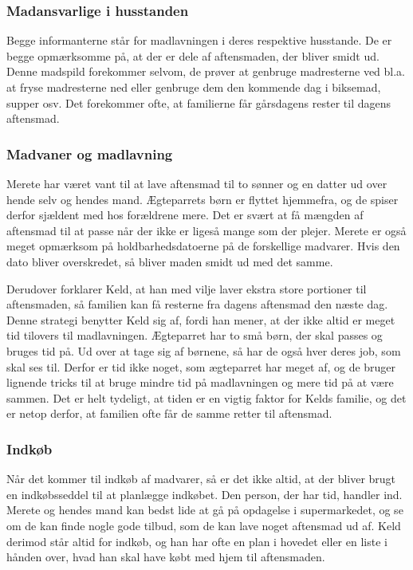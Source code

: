 \subsubsection*{Madansvarlige i husstanden}
Begge informanterne står for madlavningen i deres respektive husstande. De er begge opmærksomme på, at der er dele af aftensmaden, der bliver smidt ud. Denne madspild forekommer selvom, de prøver at genbruge madresterne ved bl.a. at fryse madresterne ned eller genbruge dem den kommende dag i \fx biksemad, supper osv. Det forekommer ofte, at familierne får gårsdagens rester til dagens aftensmad.

\subsubsection*{Madvaner og madlavning}
Merete har været vant til at lave aftensmad til to sønner og en datter ud over hende selv og hendes mand. Ægteparrets børn er flyttet hjemmefra, og de spiser derfor sjældent med hos forældrene mere. Det er svært at få mængden af aftensmad til at passe når der ikke er ligeså mange som der plejer. Merete er også meget opmærksom på holdbarhedsdatoerne på de forskellige madvarer. Hvis den dato bliver overskredet, så bliver maden smidt ud med det samme.

Derudover forklarer Keld, at han med vilje laver ekstra store portioner til aftensmaden, så familien kan få resterne fra dagens aftensmad den næste dag. Denne strategi benytter Keld sig af, fordi han mener, at der ikke altid er meget tid tilovers til madlavningen. Ægteparret har to små børn, der skal passes og bruges tid på. Ud over at tage sig af børnene, så har de også hver deres job, som skal ses til. Derfor er tid ikke noget, som ægteparret har meget af, og de bruger lignende tricks til at bruge mindre tid på madlavningen og mere tid på at være sammen. Det er helt tydeligt, at tiden er en vigtig faktor for Kelds familie, og det er netop derfor, at familien ofte får de samme retter til aftensmad.

\subsubsection*{Indkøb}
Når det kommer til indkøb af madvarer, så er det ikke altid, at der bliver brugt en indkøbsseddel til at planlægge indkøbet. Den person, der har tid, handler ind. Merete og hendes mand kan bedst lide at gå på opdagelse i supermarkedet, og se om de kan finde nogle gode tilbud, som de kan lave noget aftensmad ud af. Keld derimod står altid for indkøb, og han har ofte en plan i hovedet eller en liste i hånden over, hvad han skal have købt med hjem til aftensmaden.

